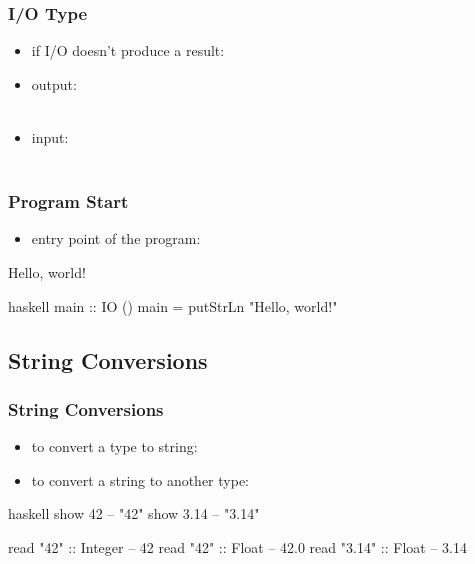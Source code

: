 \documentclass[dvipsnames]{beamer}
\theoremstyle{plain}
\begin{document}
\begin{frame}
  \frametitle{I/O Type}

  \begin{itemize}
    \item if I/O doesn't produce a result: 

    \medskip
    \item output:\\
      \smallskip
      \\

    \smallskip
    \item input:\\
      \smallskip
      \\
  \end{itemize}
\end{frame}

\begin{frame}[fragile]
  \frametitle{Program Start}

  \begin{itemize}
    \item entry point of the program: 
  \end{itemize}

  \begin{exampleblock}{Hello, world!}
    \begin{pygments}{haskell}
main :: IO ()
main = putStrLn "Hello, world!"
    \end{pygments}
  \end{exampleblock}
\end{frame}

\subsection{String Conversions}

\begin{frame}[fragile]
  \frametitle{String Conversions}

  \begin{itemize}
    \item to convert a type to string: 
    \item to convert a string to another type: 
  \end{itemize}

  \begin{exampleblock}{}
    \begin{pygments}{haskell}
show 42    -- "42"
show 3.14  -- "3.14"

read "42" :: Integer  -- 42
read "42" :: Float    -- 42.0
read "3.14" :: Float  -- 3.14
    \end{pygments}
  \end{exampleblock}
\end{frame}
\end{document}

